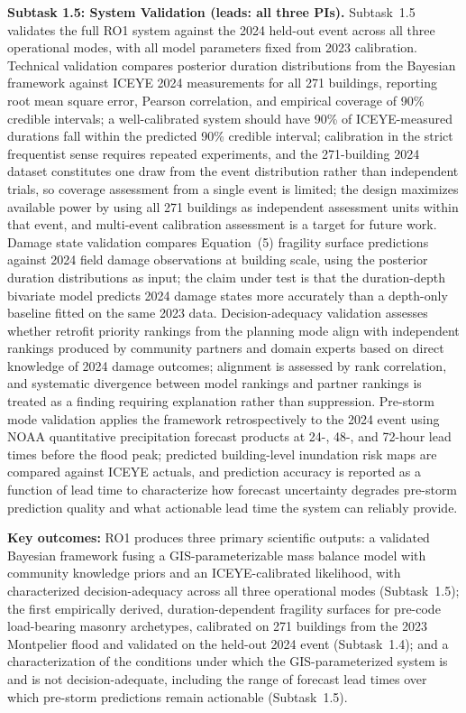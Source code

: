 \documentclass[11pt]{article}
\begin{document}
\textbf{Subtask 1.5: System Validation (leads: all three PIs).}
Subtask~1.5 validates the full RO1 system against the 2024 held-out event across
all three operational modes, with all model parameters fixed from 2023 calibration.
Technical validation compares posterior duration distributions from the Bayesian
framework against ICEYE 2024 measurements for all 271 buildings, reporting root
mean square error, Pearson correlation, and empirical coverage of 90\% credible
intervals; a well-calibrated system should have 90\% of ICEYE-measured durations
fall within the predicted 90\% credible interval; calibration in the strict
frequentist sense requires repeated experiments, and the 271-building 2024 dataset
constitutes one draw from the event distribution rather than independent trials,
so coverage assessment from a single event is limited; the design maximizes
available power by using all 271 buildings as independent assessment units within
that event, and multi-event calibration assessment is a target for future work.
Damage state validation compares Equation~(5) fragility surface predictions against
2024 field damage observations at building scale, using the posterior duration
distributions as input; the claim under test is that the duration-depth bivariate
model predicts 2024 damage states more accurately than a depth-only baseline fitted
on the same 2023 data.
Decision-adequacy validation assesses whether retrofit priority rankings from the
planning mode align with independent rankings produced by community partners and
domain experts based on direct knowledge of 2024 damage outcomes; alignment is
assessed by rank correlation, and systematic divergence between model rankings and
partner rankings is treated as a finding requiring explanation rather than
suppression.
Pre-storm mode validation applies the framework retrospectively to the 2024 event
using NOAA quantitative precipitation forecast products at 24-, 48-, and 72-hour
lead times before the flood peak; predicted building-level inundation risk maps are
compared against ICEYE actuals, and prediction accuracy is reported as a function
of lead time to characterize how forecast uncertainty degrades pre-storm prediction
quality and what actionable lead time the system can reliably provide.

\textbf{Key outcomes:} RO1 produces three primary scientific outputs: a validated
Bayesian framework fusing a GIS-parameterizable mass balance model with community
knowledge priors and an ICEYE-calibrated likelihood, with characterized
decision-adequacy across all three operational modes (Subtask~1.5); the first
empirically derived, duration-dependent fragility surfaces for pre-code
load-bearing masonry archetypes, calibrated on 271 buildings from the 2023
Montpelier flood and validated on the held-out 2024 event (Subtask~1.4); and
a characterization of the conditions under which the GIS-parameterized system
is and is not decision-adequate, including the range of forecast lead times over
which pre-storm predictions remain actionable (Subtask~1.5).
\end{document}

